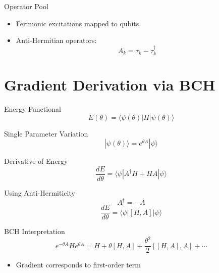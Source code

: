 \documentclass{beamer}
\begin{document}

\begin{frame}{Operator Pool}
\begin{itemize}
\item Fermionic excitations mapped to qubits
\item Anti-Hermitian operators:
\[
A_k = \tau_k - \tau_k^\dagger
\]
\end{itemize}
\end{frame}

\section{Gradient Derivation via BCH}

\begin{frame}{Energy Functional}
\[
E(\theta) = \langle \psi(\theta)|H|\psi(\theta)\rangle
\]
\end{frame}


\begin{frame}{Single Parameter Variation}
\[
|\psi(\theta)\rangle = e^{\theta A}|\psi\rangle
\]
\end{frame}


\begin{frame}{Derivative of Energy}
\[
\frac{dE}{d\theta}
=
\langle \psi | A^\dagger H + H A | \psi \rangle
\]
\end{frame}


\begin{frame}{Using Anti-Hermiticity}
\[
A^\dagger = -A
\]
\[
\frac{dE}{d\theta}
=
\langle \psi | [H,A] | \psi \rangle
\]
\end{frame}


\begin{frame}{BCH Interpretation}
\[
e^{-\theta A} H e^{\theta A}
=
H + \theta[H,A] + \frac{\theta^2}{2}[[H,A],A] + \cdots
\]
\begin{itemize}
\item Gradient corresponds to first-order term
\end{itemize}
\end{frame}
\end{document}
